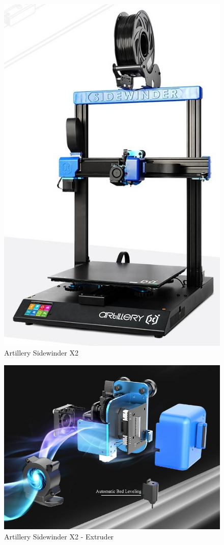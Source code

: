 \begin{figure}[h!tb]
\begin{multicols}{3}
\includegraphics[scale=0.20]{x2-f3-edited.jpg}
\end{multicols}
\caption{Artillery Sidewinder X2}
\label{fig:label1}
\end{figure}

\begin{figure}[h!tb]
\centering
\includegraphics[scale=0.40]{x2-e-edited.jpg}
\caption{Artillery Sidewinder X2 - Extruder}
\label{fig:label2}
\end{figure}


